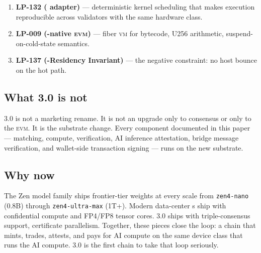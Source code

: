 \begin{enumerate}[leftmargin=1.4em]
  \item \textbf{LP-132 (\QuasarGPU{} adapter)} --- deterministic kernel
        scheduling that makes \GPU{} execution reproducible across
        validators with the same hardware class.
  \item \textbf{LP-009 (\GPU{}-native \textsc{evm})} --- fiber \textsc{vm}
        for bytecode, U256 arithmetic, suspend-on-cold-state semantics.
  \item \textbf{LP-137 (\GPU{}-Residency Invariant)} --- the negative
        constraint: no host bounce on the hot path.
\end{enumerate}

\subsection{What \Zoo{} 3.0 is not}

\Zoo{} 3.0 is not a marketing rename. It is not an upgrade only to consensus
or only to the \textsc{evm}. It is the substrate change. Every component
documented in this paper --- \DEX{} matching, \FHE{} compute, \ZKP{}
verification, AI inference attestation, bridge message verification, and
wallet-side transaction signing --- runs on the new substrate.

\subsection{Why now}

The Zen model family ships frontier-tier weights at every scale from
\texttt{zen4-nano} (0.8B) through \texttt{zen4-ultra-max} (1T+). Modern
data-center \GPU{}s ship with confidential compute and FP4/FP8 tensor
cores. \Quasar{} 3.0 ships with triple-consensus support, certificate
parallelism. Together, these pieces close the loop: a chain that mints,
trades, attests, and pays for AI compute on the same device class that
runs the AI compute. \Zoo{} 3.0 is the first chain to take that loop
seriously.
